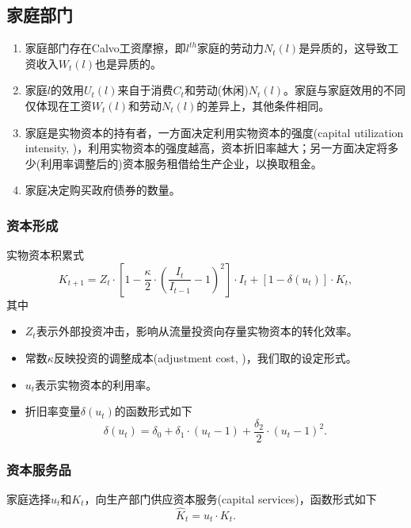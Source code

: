 \subsection{家庭部门}
\label{sec:HH-sector}
\begin{enumerate}
\item 家庭部门存在Calvo工资摩擦，即$l^{th}$家庭的劳动力$N_t(l)$是异质的，这导致工资收入$W_t(l)$也是异质的\citep{Calvo:1983uqa, Erceg:2000dm}。
\item 家庭$l$的效用$U_t(l)$来自于消费$C_t$和劳动(休闲)$N_t(l)$。家庭与家庭效用的不同仅体现在工资$W_t(l)$和劳动$N_t(l)$的差异上，其他条件相同。
\item 家庭是实物资本的持有者，一方面决定利用实物资本的强度(capital utilization intensity, \cite{Greenwood:1988jn})，利用实物资本的强度越高，资本折旧率越大；另一方面决定将多少(利用率调整后的)资本服务租借给生产企业，以换取租金。
\item 家庭决定购买政府债券的数量。
\end{enumerate}

\subsubsection{资本形成}
实物资本积累式
\begin{equation}
\label{eq:MS-capital-accumulation}
K_{t+1} = Z_t \cdot \left[
1 - \frac{\kappa}{2} \cdot \left(\frac{I_t}{I_{t-1}} -1\right)^2
\right] \cdot I_t + \left[
1- \delta(u_t)
\right] \cdot K_t,
\end{equation}
其中\begin{itemize}
\item $Z_t$表示外部投资冲击，影响从流量投资向存量实物资本的转化效率。
\item 常数$\kappa$反映投资的调整成本(adjustment cost, \cite{Lucasjoin:1971hx, Hayashi:1982bc})，我们取\cite{Christiano:2005ib}的设定形式。
\item $u_t$表示实物资本的利用率。
\item 折旧率变量$\delta(u_t)$的函数形式如下
\begin{equation}
\label{eq:MS-capital-depreciation}
\delta(u_t) = \delta_0 + \delta_1 \cdot (u_t -1) + \frac{\delta_2}{2} \cdot \left(u_t -1\right)^2.
\end{equation}
\end{itemize}

\subsubsection{资本服务品}
家庭选择$u_t$和$K_t$，向生产部门供应资本服务(capital services)，函数形式如下
\begin{equation}
\label{eq:MC-hh-capital-services}
\hat{K}_t = u_t \cdot K_t.
\end{equation}

